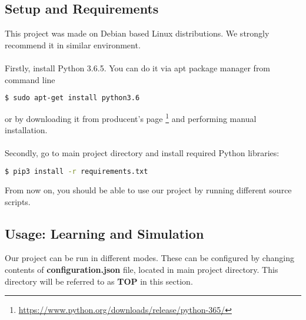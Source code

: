 \documentclass{article}
\begin{document}
\subsection{Setup and Requirements}
This project was made on Debian based Linux distributions. We strongly 
recommend it in similar environment. 
\\\\
Firstly, install Python 3.6.5. You can do it via apt package manager from command line
\begin{lstlisting}[language=bash]
$ sudo apt-get install python3.6 
\end{lstlisting}
or by downloading it from producent's page
\footnote{\url{https://www.python.org/downloads/release/python-365/}}
 and performing manual installation.
\\ \\ 
Secondly, go to main project directory and install required Python libraries:
\begin{lstlisting}[language=bash]
$ pip3 install -r requirements.txt
\end{lstlisting}
From now on, you should be able to use our project by running different source scripts.

\subsection{Usage: Learning and Simulation}
Our project can be run in different modes. These can be configured by changing contents of 
\textbf{configuration.json} file, located in main project directory. This directory will be referred to as 
\textbf{TOP} in this section.
\end{document}

